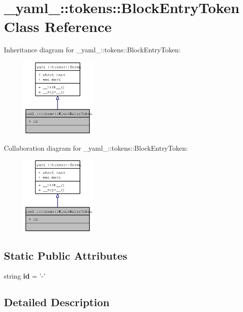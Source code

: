 \section{\_\-yaml\_\-::tokens::BlockEntryToken Class Reference}
\label{class__yaml___1_1tokens_1_1BlockEntryToken}
Inheritance diagram for \_\-yaml\_\-::tokens::BlockEntryToken:\nopagebreak
\begin{figure}[H]
\begin{center}
\leavevmode
\includegraphics[width=108pt]{class__yaml___1_1tokens_1_1BlockEntryToken__inherit__graph}
\end{center}
\end{figure}
Collaboration diagram for \_\-yaml\_\-::tokens::BlockEntryToken:\nopagebreak
\begin{figure}[H]
\begin{center}
\leavevmode
\includegraphics[width=108pt]{class__yaml___1_1tokens_1_1BlockEntryToken__coll__graph}
\end{center}
\end{figure}
\subsection*{Static Public Attributes}
\begin{CompactItemize}
\item 
string {\bf id} = '-'
\end{CompactItemize}


\subsection{Detailed Description}


